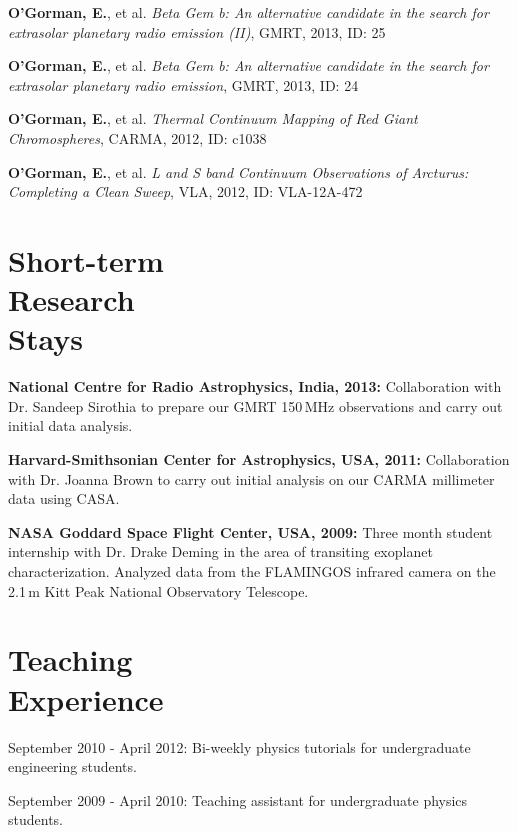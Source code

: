 \documentclass[margin,line]{resume}
\begin{document}
\begin{resume}
\textbf{O'Gorman, E.}, et al. \textit{Beta Gem b: An alternative candidate in the search for extrasolar planetary radio emission (II)}, GMRT, 2013, ID: 25%

\textbf{O'Gorman, E.}, et al. \textit{Beta Gem b: An alternative candidate in the search for extrasolar planetary radio emission}, GMRT, 2013, ID: 24%

\textbf{O'Gorman, E.}, et al. \textit{Thermal Continuum Mapping of Red Giant Chromospheres}, CARMA, 2012, ID: c1038%

\textbf{O'Gorman, E.}, et al. \textit{L and S band Continuum Observations of Arcturus: Completing a Clean Sweep}, VLA, 2012, ID: VLA-12A-472%

    \vspace{4mm}
    \section{\mysidestyle Short-term\\Research\\Stays}

\textbf{National Centre for Radio Astrophysics, India, 2013:} Collaboration with Dr. Sandeep Sirothia to prepare our GMRT 150\,MHz observations and carry out initial data analysis.

\textbf{Harvard-Smithsonian Center for Astrophysics, USA, 2011:} Collaboration with Dr. Joanna Brown to carry out initial analysis on our CARMA millimeter data using CASA. 

\textbf{NASA Goddard Space Flight Center, USA, 2009:} Three month student internship with Dr. Drake Deming in the area of transiting exoplanet characterization. Analyzed data from the FLAMINGOS infrared camera on the 2.1\,m Kitt Peak National Observatory Telescope.

    \vspace{4mm}
    \section{\mysidestyle Teaching\\Experience}

	\begin{list2}
    \item September 2010 - April 2012: Bi-weekly physics tutorials for undergraduate engineering students.
    \item September 2009 - April 2010: Teaching assistant for undergraduate physics students. \vspace{-1mm}\\%
    \end{list2}


\end{resume}
\end{document}
